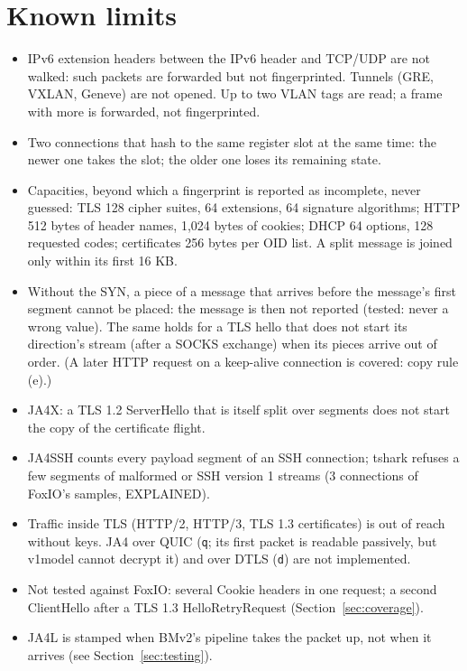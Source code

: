 \documentclass[11pt,a4paper]{article}
\newcommand{\code}[1]{\texttt{#1}}
\begin{document}
\section{Known limits}
\begin{itemize}
\item IPv6 extension headers between the IPv6 header and TCP/UDP are not walked: such packets are forwarded but not
  fingerprinted. Tunnels (GRE, VXLAN, Geneve) are not opened. Up to two VLAN tags are read; a frame with more is
  forwarded, not fingerprinted.
\item Two connections that hash to the same register slot at the same time: the newer one takes the slot; the older
  one loses its remaining state.
\item Capacities, beyond which a fingerprint is reported as incomplete, never guessed: TLS 128 cipher suites, 64
  extensions, 64 signature algorithms; HTTP 512 bytes of header names, 1,024 bytes of cookies; DHCP 64 options, 128
  requested codes; certificates 256 bytes per OID list. A split message is joined only within its first 16 KB.
\item Without the SYN, a piece of a message that arrives before the message's first segment cannot be placed: the
  message is then not reported (tested: never a wrong value). The same holds for a TLS hello that does not start
  its direction's stream (after a SOCKS exchange) when its pieces arrive out of order. (A later HTTP request on a
  keep-alive connection is covered: copy rule (e).)
\item JA4X: a TLS 1.2 ServerHello that is itself split over segments does not start the copy of the certificate
  flight.
\item JA4SSH counts every payload segment of an SSH connection; tshark refuses a few segments of malformed or SSH
  version 1 streams (3 connections of FoxIO's samples, EXPLAINED).
\item Traffic inside TLS (HTTP/2, HTTP/3, TLS 1.3 certificates) is out of reach without keys. JA4 over QUIC
  (\code{q}; its first packet is readable passively, but v1model cannot decrypt it) and over DTLS (\code{d}) are not
  implemented.
\item Not tested against FoxIO: several Cookie headers in one request; a second ClientHello after a TLS 1.3
  HelloRetryRequest (Section~\ref{sec:coverage}).
\item JA4L is stamped when BMv2's pipeline takes the packet up, not when it arrives (see Section~\ref{sec:testing}).
\end{itemize}
\end{document}
